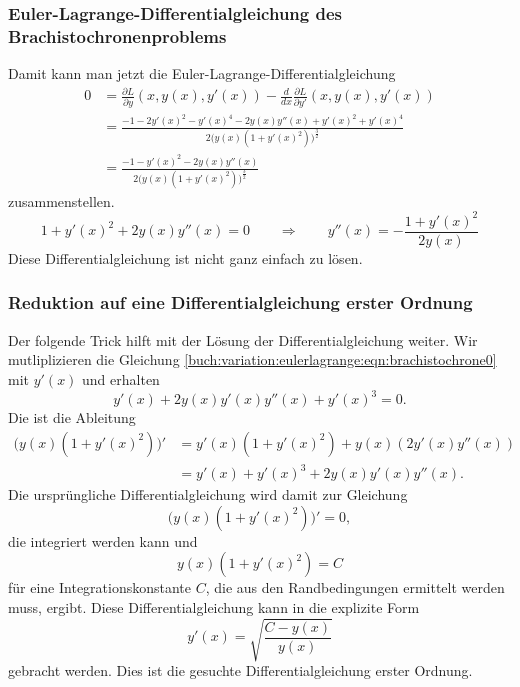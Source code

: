 \subsubsection{Euler-Lagrange-Differentialgleichung des
Brachistochronenproblems}
Damit kann man jetzt die Euler-Lagrange-Differentialgleichung
\begin{align*}
0
&=
\frac{\partial L}{\partial y}(x,y(x),y'(x))
-
\frac{d}{dx}
\frac{\partial L}{\partial y'}(x,y(x),y'(x))
\\
&=
\frac{
-1 - 2y'(x)^2 - y'(x)^4
-2y(x)y''(x)+y'(x)^2+y'(x)^4
}{
2
\bigl(
y(x)
(1+y'(x)^2)
\bigr)^{\frac32}
}
\\
&=
\frac{
-1 - y'(x)^2
-2y(x)y''(x)
}{
2
\bigl(
y(x)
(1+y'(x)^2)
\bigr)^{\frac32}
}
\end{align*}
zusammenstellen.
\begin{equation}
1+y'(x)^2+2y(x)y''(x)=0
\qquad\Rightarrow\qquad
y''(x)
=
-\frac{1+y'(x)^2}{2y(x)}
\label{buch:variation:eulerlagrange:eqn:brachistochrone0}
\end{equation}
Diese Differentialgleichung ist nicht ganz einfach zu lösen.

%
%
\subsubsection{Reduktion auf eine Differentialgleichung erster Ordnung}
Der folgende Trick hilft mit der Lösung der Differentialgleichung weiter.
Wir mutliplizieren die Gleichung
\eqref{buch:variation:eulerlagrange:eqn:brachistochrone0}
mit $y'(x)$ und erhalten
\begin{equation}
y'(x) + 2y(x)y'(x)y''(x) + y'(x)^3 = 0.
\label{buch:variation:eulerlagrange:eqn:multiplikation}
\end{equation}
Die ist die Ableitung
\begin{align*}
\bigl(
y(x)(1+y'(x)^2)
\bigr)'
&=
y'(x)(1+y'(x)^2)
+
y(x)(2y'(x)y''(x))
\\
&=
y'(x) + y'(x)^3
+2y(x)y'(x)y''(x).
\end{align*}
Die ursprüngliche Differentialgleichung wird damit zur Gleichung
\[
\bigl(
y(x)(1+y'(x)^2)
\bigr)'
=
0,
\]
die integriert werden kann und
\[
y(x)(1+y'(x)^2)
=
C
\]
für eine Integrationskonstante $C$, die aus den Randbedingungen
ermittelt werden muss, ergibt.
Diese Differentialgleichung kann in die explizite Form
\begin{equation}
y'(x)
=
\sqrt{
\frac{C-y(x)}{y(x)}
}
\label{buch:variation:eulerlagrange:eqn:brachistochrone1}
\end{equation}
gebracht werden.
Dies ist die gesuchte Differentialgleichung erster Ordnung.

